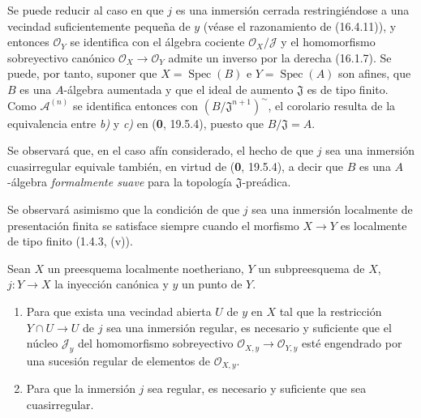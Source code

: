 Se puede reducir al caso en que $j$ es una inmersión cerrada restringiéndose
a una vecindad suficientemente pequeña de $y$ (véase el razonamiento de
(16.4.11)), y entonces $\mathcal{O}_Y$ se identifica con el álgebra cociente
$\mathcal{O}_X/\mathscr{J}$ y el homomorfismo sobreyectivo canónico
$\mathcal{O}_X\to\mathcal{O}_Y$ admite un
inverso por la derecha (16.1.7). Se puede, por tanto, suponer que
$X=\operatorname{Spec}(B)$ e $Y=\operatorname{Spec}(A)$ son afines, que $B$
es una $A$-álgebra aumentada y que el ideal de aumento $\mathfrak{J}$ es de
tipo finito. Como $\mathscr{A}^{(n)}$ se identifica entonces con
$(B/\mathfrak{J}^{n+1})^{\sim}$, el corolario resulta de la equivalencia entre
\emph{b)} y \emph{c)} en (\textbf 0, 19.5.4), puesto que $B/\mathfrak{J}=A$.

Se observará que, en el caso afín considerado, el hecho de que $j$ sea una
inmersión cuasirregular equivale también, en virtud de (\textbf 0, 19.5.4), a decir
que $B$ es una $A$-álgebra \emph{formalmente suave} para la topología
$\mathfrak{J}$-preádica.

Se observará asimismo que la condición de que $j$ sea una inmersión localmente de
presentación finita se satisface siempre cuando el morfismo $X\to Y$ es
localmente de tipo finito (1.4.3, (v)).

\begin{proposition}[16.9.10]
\label{IV.16.9.10}
Sean $X$ un preesquema localmente noetheriano, $Y$ un subpreesquema de $X$,
$j:Y\to X$ la inyección canónica y $y$ un punto de $Y$.
\begin{enumerate}
  \item[\textup{(i)}] Para que exista una vecindad abierta $U$ de $y$ en $X$ tal que
  la restricción $Y\cap U\to U$ de $j$ sea una inmersión regular, es necesario
  y suficiente que el núcleo $\mathscr{J}_y$ del homomorfismo sobreyectivo
  $\mathcal{O}_{X,y}\to\mathcal{O}_{Y,y}$ esté engendrado por una sucesión
  regular de elementos de $\mathcal{O}_{X,y}$.
  \item[\textup{(ii)}] Para que la inmersión $j$ sea regular, es necesario y suficiente
  que sea cuasirregular.
\end{enumerate}
\end{proposition}

